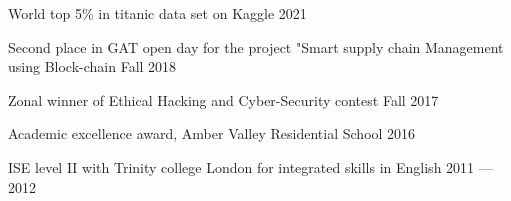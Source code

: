 World top 5\% in titanic data set on Kaggle	\hfill 2021
 
Second place in GAT open day for the project "Smart supply chain Management using Block-chain	\hfill Fall 2018

Zonal winner of Ethical Hacking and Cyber-Security contest	\hfill Fall 2017

Academic excellence award, Amber Valley Residential School	\hfill 2016

ISE level II with Trinity college London for integrated skills in English \hfill 2011 --- 2012